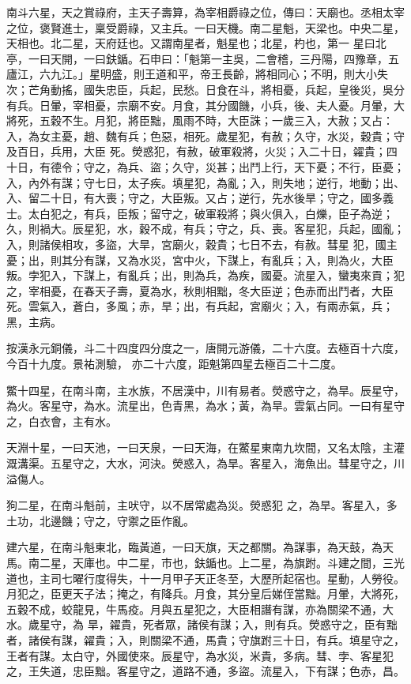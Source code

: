 \begin{pinyinscope}
 南斗六星，天之賞祿府，主天子壽算，為宰相爵祿之位，傳曰：天廟也。丞相太宰之位，褒賢進士，稟受爵祿，又主兵。一曰天機。南二星魁，天梁也。中央二星，天相也。北二星，天府廷也。又謂南星者，魁星也；北星，杓也，第一
 星曰北亭，一曰天開，一曰鈇鍎。石申曰：「魁第一主吳，二會稽，三丹陽，四豫章，五廬江，六九江。」星明盛，則王道和平，帝王長齡，將相同心；不明，則大小失次；芒角動搖，國失忠臣，兵起，民愁。日食在斗，將相憂，兵起，皇後災，吳分有兵。日暈，宰相憂，宗廟不安。月食，其分國饑，小兵，後、夫人憂。月暈，大將死，五穀不生。月犯，將臣黜，風雨不時，大臣誅；一歲三入，大赦；又占：入，為女主憂，趙、魏有兵；色惡，相死。歲星犯，有赦；久守，水災，穀貴；守及百日，兵用，大臣
 死。熒惑犯，有赦，破軍殺將，火災；入二十日，糴貴；四十日，有德令；守之，為兵、盜；久守，災甚；出鬥上行，天下憂；不行，臣憂；入，內外有謀；守七日，太子疾。填星犯，為亂；入，則失地；逆行，地動；出、入、留二十日，有大喪；守之，大臣叛。又占；逆行，先水後旱；守之，國多義士。太白犯之，有兵，臣叛；留守之，破軍殺將；與火俱入，白爍，臣子為逆；久，則禍大。辰星犯，水，穀不成，有兵；守之，兵、喪。客星犯，兵起，國亂；入，則諸侯相攻，多盜，大旱，宮廟火，穀貴；七日不去，有赦。彗星
 犯，國主憂；出，則其分有謀，又為水災，宮中火，下謀上，有亂兵；入，則為火，大臣叛。孛犯入，下謀上，有亂兵；出，則為兵，為疾，國憂。流星入，蠻夷來貢；犯之，宰相憂，在春天子壽，夏為水，秋則相黜，冬大臣逆；色赤而出鬥者，大臣死。雲氣入，蒼白，多風；赤，旱；出，有兵起，宮廟火；入，有兩赤氣，兵；黑，主病。



 按漢永元銅儀，斗二十四度四分度之一，唐開元游儀，二十六度。去極百十六度，今百十九度。景祐測驗，
 亦二十六度，距魁第四星去極百二十二度。



 鱉十四星，在南斗南，主水族，不居漢中，川有易者。熒惑守之，為旱。辰星守，為火。客星守，為水。流星出，色青黑，為水；黃，為旱。雲氣占同。一曰有星守之，白衣會，主有水。



 天淵十星，一曰天池，一曰天泉，一曰天海，在鱉星東南九坎間，又名太陰，主灌溉溝渠。五星守之，大水，河決。熒惑入，為旱。客星入，海魚出。彗星守之，川溢傷人。



 狗二星，在南斗魁前，主吠守，以不居常處為災。熒惑犯
 之，為旱。客星入，多土功，北邊饑；守之，守禦之臣作亂。



 建六星，在南斗魁東北，臨黃道，一曰天旗，天之都關。為謀事，為天鼓，為天馬。南二星，天庫也。中二星，市也，鈇鍎也。上二星，為旗跗。斗建之間，三光道也，主司七曜行度得失，十一月甲子天正冬至，大歷所起宿也。星動，人勞役。月犯之，臣更天子法；掩之，有降兵。月食，其分皇后娣侄當黜。月暈，大將死，五穀不成，蛟龍見，牛馬疫。月與五星犯之，大臣相譖有謀，亦為關梁不通，大水。歲星守，為
 旱，糴貴，死者眾，諸侯有謀；入，則有兵。熒惑守之，臣有黜者，諸侯有謀，糴貴；入，則關梁不通，馬貴；守旗跗三十日，有兵。填星守之，王者有謀。太白守，外國使來。辰星守，為水災，米貴，多病。彗、孛、客星犯之，王失道，忠臣黜。客星守之，道路不通，多盜。流星入，下有謀；色赤，昌。




\end{pinyinscope}
